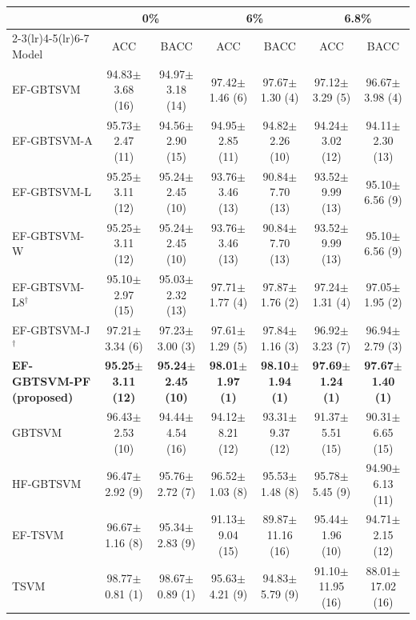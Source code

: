 \begin{tabular}{l*{6}{c}}
\toprule
&\multicolumn{2}{c}{0\%}&\multicolumn{2}{c}{6\%}&\multicolumn{2}{c}{6.8\%}\\
\cmidrule(lr){2-3}\cmidrule(lr){4-5}\cmidrule(lr){6-7}
Model & ACC & BACC & ACC & BACC & ACC & BACC \\
\midrule
EF-GBTSVM & 94.83$\pm$3.68 (16) & 94.97$\pm$3.18 (14) & 97.42$\pm$1.46 (6) & 97.67$\pm$1.30 (4) & 97.12$\pm$3.29 (5) & 96.67$\pm$3.98 (4) \\
EF-GBTSVM-A & 95.73$\pm$2.47 (11) & 94.56$\pm$2.90 (15) & 94.95$\pm$2.85 (11) & 94.82$\pm$2.26 (10) & 94.24$\pm$3.02 (12) & 94.11$\pm$2.30 (13) \\
EF-GBTSVM-L & 95.25$\pm$3.11 (12) & 95.24$\pm$2.45 (10) & 93.76$\pm$3.46 (13) & 90.84$\pm$7.70 (13) & 93.52$\pm$9.99 (13) & 95.10$\pm$6.56 (9) \\
EF-GBTSVM-W & 95.25$\pm$3.11 (12) & 95.24$\pm$2.45 (10) & 93.76$\pm$3.46 (13) & 90.84$\pm$7.70 (13) & 93.52$\pm$9.99 (13) & 95.10$\pm$6.56 (9) \\
EF-GBTSVM-L8$^{\dagger}$ & 95.10$\pm$2.97 (15) & 95.03$\pm$2.32 (13) & 97.71$\pm$1.77 (4) & 97.87$\pm$1.76 (2) & 97.24$\pm$1.31 (4) & 97.05$\pm$1.95 (2) \\
EF-GBTSVM-J$^{\dagger}$ & 97.21$\pm$3.34 (6) & 97.23$\pm$3.00 (3) & 97.61$\pm$1.29 (5) & 97.84$\pm$1.16 (3) & 96.92$\pm$3.23 (7) & 96.94$\pm$2.79 (3) \\
\cellcolor{proposedrow}\textbf{EF-GBTSVM-PF (proposed)} & \cellcolor{proposedrow}\textbf{95.25$\pm$3.11 (12)} & \cellcolor{proposedrow}\textbf{95.24$\pm$2.45 (10)} & \cellcolor{proposedrow}\textbf{98.01$\pm$1.97 (1)} & \cellcolor{proposedrow}\textbf{98.10$\pm$1.94 (1)} & \cellcolor{proposedrow}\textbf{97.69$\pm$1.24 (1)} & \cellcolor{proposedrow}\textbf{97.67$\pm$1.40 (1)} \\
GBTSVM & 96.43$\pm$2.53 (10) & 94.44$\pm$4.54 (16) & 94.12$\pm$8.21 (12) & 93.31$\pm$9.37 (12) & 91.37$\pm$5.51 (15) & 90.31$\pm$6.65 (15) \\
HF-GBTSVM & 96.47$\pm$2.92 (9) & 95.76$\pm$2.72 (7) & 96.52$\pm$1.03 (8) & 95.53$\pm$1.48 (8) & 95.78$\pm$5.45 (9) & 94.90$\pm$6.13 (11) \\
EF-TSVM & 96.67$\pm$1.16 (8) & 95.34$\pm$2.83 (9) & 91.13$\pm$9.04 (15) & 89.87$\pm$11.16 (16) & 95.44$\pm$1.96 (10) & 94.71$\pm$2.15 (12) \\
TSVM & 98.77$\pm$0.81 (1) & 98.67$\pm$0.89 (1) & 95.63$\pm$4.21 (9) & 94.83$\pm$5.79 (9) & 91.10$\pm$11.95 (16) & 88.01$\pm$17.02 (16) \\

\end{tabular}
